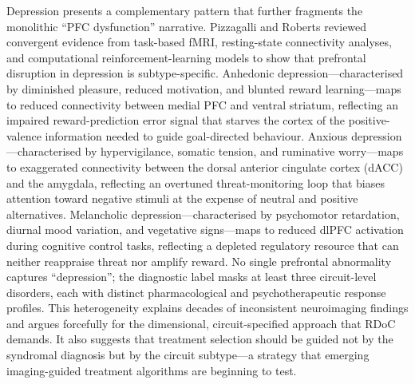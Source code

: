 Depression presents a complementary pattern that further fragments the
monolithic ``PFC dysfunction'' narrative.  Pizzagalli and Roberts reviewed
convergent evidence from task-based fMRI, resting-state connectivity
analyses, and computational reinforcement-learning models to show that
prefrontal disruption in depression is subtype-specific.\cite{pizzagalli2021}  Anhedonic
depression---characterised by diminished pleasure, reduced motivation, and
blunted reward learning---maps to reduced connectivity between medial PFC
and ventral striatum, reflecting an impaired reward-prediction error signal
that starves the cortex of the positive-valence information needed to guide
goal-directed behaviour.  Anxious depression---characterised by
hypervigilance, somatic tension, and ruminative worry---maps to exaggerated
connectivity between the dorsal anterior cingulate cortex (dACC) and the
amygdala, reflecting an overtuned threat-monitoring loop that biases
attention toward negative stimuli at the expense of neutral and positive
alternatives.  Melancholic depression---characterised by psychomotor
retardation, diurnal mood variation, and vegetative signs---maps to
reduced dlPFC activation during cognitive control tasks, reflecting a
depleted regulatory resource that can neither reappraise threat nor amplify
reward.  No single prefrontal abnormality captures ``depression''; the
diagnostic label masks at least three circuit-level disorders, each with
distinct pharmacological and psychotherapeutic response profiles.  This
heterogeneity explains decades of inconsistent neuroimaging findings and
argues forcefully for the dimensional, circuit-specified approach that RDoC
demands.  It also suggests that treatment selection should be guided not by
the syndromal diagnosis but by the circuit subtype---a strategy that
emerging imaging-guided treatment algorithms are beginning to test.

